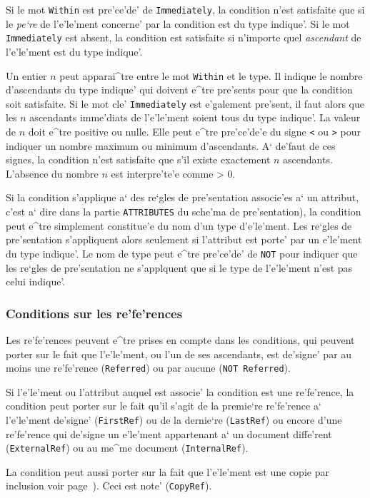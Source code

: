 {Si le mot {\tt Within} est pre'ce'de' de {\tt Immediately},
la condition n'est satisfaite que si le {\em pe`re} de l'e'le'ment concerne'
par la condition est du type indique'. Si le mot {\tt Immediately} est absent,
la condition est satisfaite si n'importe quel {\em ascendant} de l'e'le'ment
est du type indique'.

Un entier $n$ peut apparai^tre entre le mot {\tt Within} et le type.
Il indique le nombre d'ascendants du type indique' qui doivent e^tre
pre'sents pour que la condition soit satisfaite. Si le mot cle'
{\tt Immediately} est e'galement pre'sent, il faut alors que les $n$
ascendants imme'diats de l'e'le'ment soient tous du type indique'.
La valeur de $n$ doit e^tre positive ou nulle. Elle peut e^tre pre'ce'de'e
du signe {\tt <} ou {\tt >} pour indiquer un nombre maximum ou minimum
d'ascendants. A` de'faut de ces signes, la condition n'est satisfaite que
s'il existe exactement $n$ ascendants. L'absence du nombre $n$ est
interpre'te'e comme > 0.

Si la condition s'applique a` des re`gles de pre'sentation associe'es a`
un attribut, c'est a` dire dans la partie {\tt ATTRIBUTES} du sche'ma de
pre'sentation), la condition peut e^tre simplement constitue'e du nom
d'un type d'e'le'ment. Les re`gles de pre'sentation s'appliquent alors
seulement si l'attribut est porte' par un e'le'ment du type indique'.
Le nom de type peut e^tre pre'ce'de' de {\tt NOT} pour indiquer que
les re`gles de pre'sentation ne s'applquent que si le type de l'e'le'ment
n'est pas celui indique'.

\subsubsection{Conditions sur les re'fe'rences}

Les re'fe'rences peuvent e^tre prises en compte dans les conditions, qui
peuvent porter sur le fait que l'e'le'ment, ou l'un de ses ascendants, est
de'signe' par au moins une re'fe'rence ({\tt Referred}) ou par aucune
({\tt NOT Referred}).

Si l'e'le'ment ou l'attribut auquel est associe' la
condition est une re'fe'rence, la condition peut porter sur le fait qu'il
s'agit de la premie`re re'fe'rence a` l'e'le'ment de'signe' ({\tt FirstRef})
ou de la dernie`re ({\tt LastRef}) ou encore d'une re'fe'rence qui de'signe
un e'le'ment appartenant a` un document diffe'rent ({\tt ExternalRef}) ou
au me^me document ({\tt InternalRef}).

La condition peut aussi porter sur la fait que l'e'le'ment est une
copie par inclusion voir page~\pageref{inclusion}). Ceci est note'
({\tt CopyRef}).

}
